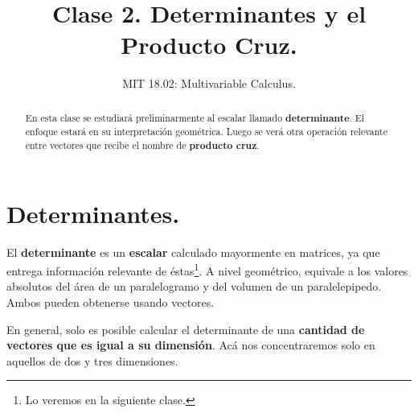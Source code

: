 \documentclass[12pt]{article}
\title{Clase 2. Determinantes y el Producto Cruz.}
\author{MIT 18.02: Multivariable Calculus.}
\date{}
\begin{document}
\newcommand{\vecmat}[1]{\mathbf{#1}}                          %
\newcommand{\unitvec}[1]{\vecmat{\hat{#1}}}                   %
\newcommand{\overvec}[1]{\overrightarrow{#1}}                 %
\newcommand{\proy}[2]{\text{proy}_{\vecmat{#2}}{\vecmat{#1}}} %
\newcommand{\R}[0]{\mathbb{R}}                                %
\newcommand{\N}[0]{\mathbb{N}}                                %

\maketitle

\begin{abstract}
\noindent En esta clase se estudiará preliminarmente al escalar llamado \textbf{determinante}. El enfoque estará en su interpretación geométrica. Luego se verá otra operación relevante entre vectores que recibe el nombre de \textbf{producto cruz}.
\end{abstract}


\section{Determinantes.}

El \textbf{determinante} es un \textbf{escalar} calculado mayormente en matrices, ya que entrega información relevante de éstas\footnote{Lo veremos en la siguiente clase.}. A nivel geométrico, equivale a los valores absolutos del área de un paralelogramo y del volumen de un paralelepipedo. Ambos pueden obtenerse usando vectores.

En general, solo es posible calcular el determinante de una \textbf{cantidad de vectores que es igual a su dimensión}. Acá nos concentraremos solo en aquellos de dos y tres dimensiones.
\end{document}
